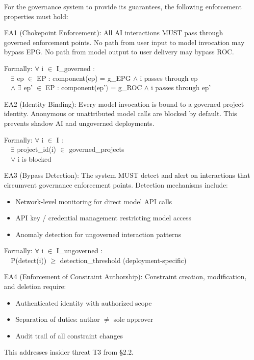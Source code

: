 \begin{cdef}
For the governance system to provide its guarantees, the following enforcement properties must hold:

EA1 (Chokepoint Enforcement): All AI interactions MUST pass through governed enforcement points. No path from user input to model invocation may bypass EPG. No path from model output to user delivery may bypass ROC.

\begin{claddisp}
Formally: $\forall$ i $\in$ I\_governed :\\
~~$\exists$ ep $\in$ EP : component(ep) = g\_EPG $\wedge$ i passes through ep\\
~~$\wedge$ $\exists$ ep' $\in$ EP : component(ep') = g\_ROC $\wedge$ i passes through ep'\\
\end{claddisp}
EA2 (Identity Binding): Every model invocation is bound to a governed project identity. Anonymous or unattributed model calls are blocked by default. This prevents shadow AI and ungoverned deployments.

\begin{claddisp}
Formally: $\forall$ i $\in$ I :\\
~~$\exists$ project\_id(i) $\in$ governed\_projects\\
~~$\vee$ i is blocked\\
\end{claddisp}
EA3 (Bypass Detection): The system MUST detect and alert on interactions that circumvent governance enforcement points. Detection mechanisms include:
\begin{itemize}
  \item Network-level monitoring for direct model API calls
  \item API key / credential management restricting model access
  \item Anomaly detection for ungoverned interaction patterns
\end{itemize}

\begin{claddisp}
Formally: $\forall$ i $\in$ I\_ungoverned :\\
~~P(detect(i)) $\geq$ detection\_threshold (deployment-specific)\\
\end{claddisp}
EA4 (Enforcement of Constraint Authorship): Constraint creation, modification, and deletion require:
\begin{itemize}
  \item Authenticated identity with authorized scope
  \item Separation of duties: author $\neq$ sole approver
  \item Audit trail of all constraint changes
\end{itemize}
This addresses insider threat T3 from \S{}2.2.

\end{cdef}


